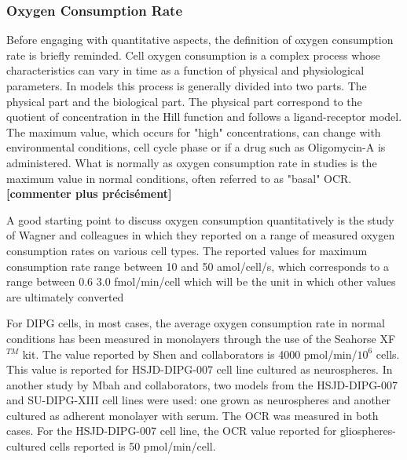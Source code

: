 \documentclass[11pt,a4paper]{article}
\begin{document}
\subsubsection{Oxygen Consumption Rate}
Before engaging with quantitative aspects, the definition of oxygen consumption rate is briefly reminded. Cell oxygen consumption is a complex process whose characteristics can vary in time as a function of physical and physiological parameters. In models this process is generally divided into two parts. The physical part and the biological part. The physical part correspond to the quotient of concentration in the Hill function and follows a ligand-receptor model. The maximum value, which occurs for "high" concentrations, can change with environmental conditions, cell cycle phase or if a drug such as Oligomycin-A is administered. What is normally as oxygen consumption rate in studies is the maximum value in normal conditions, often referred to as "basal" OCR. \textbf{[commenter plus précisément]}

A good starting point to discuss oxygen consumption quantitatively is the study of Wagner and colleagues in which they reported on a range of measured oxygen consumption rates on various cell types.\cite{Wagner2011} The reported values for maximum consumption rate range between 10 and 50 amol/cell/s, which corresponds to a range between 0.6 3.0 fmol/min/cell which will be the unit in which other values are ultimately converted

For DIPG cells, in most cases, the average oxygen consumption rate in normal conditions has been measured in monolayers through the use of the Seahorse XF$^{TM}$ kit.\cite{RomeroAgilent} The value reported by Shen and collaborators is 4000 pmol/min/$10^6$ cells. This value is reported for HSJD-DIPG-007 cell line cultured as neurospheres.\cite{Shen2019} In another study by Mbah and collaborators, two models from the HSJD-DIPG-007 and SU-DIPG-XIII cell lines were used: one grown as neurospheres and another cultured as adherent monolayer with serum. The OCR was measured in both cases. For the HSJD-DIPG-007 cell line, the OCR value reported for gliospheres-cultured cells reported is 50 pmol/min/cell.\cite{Mbah2022}
\end{document}
